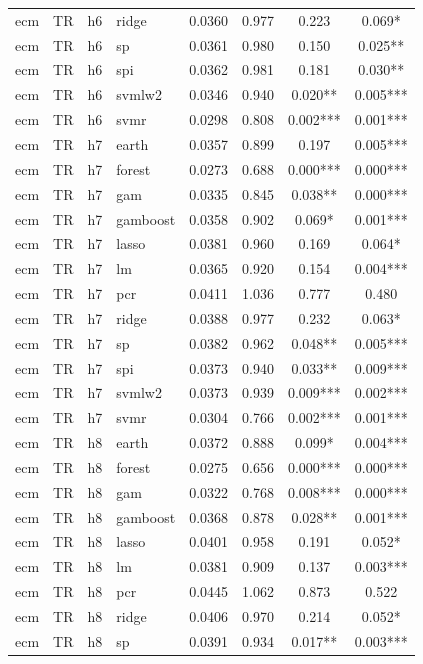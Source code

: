 \begin{ThreePartTable}
\begin{longtable}[t]{llclcccc}
ecm & TR & h6 & ridge & 0.0360 & 0.977 & 0.223 & 0.069*\\
ecm & TR & h6 & sp & 0.0361 & 0.980 & 0.150 & 0.025**\\
ecm & TR & h6 & spi & 0.0362 & 0.981 & 0.181 & 0.030**\\
ecm & TR & h6 & svmlw2 & 0.0346 & 0.940 & 0.020** & 0.005***\\
ecm & TR & h6 & svmr & 0.0298 & 0.808 & 0.002*** & 0.001***\\
\addlinespace
ecm & TR & h7 & earth & 0.0357 & 0.899 & 0.197 & 0.005***\\
ecm & TR & h7 & forest & 0.0273 & 0.688 & 0.000*** & 0.000***\\
ecm & TR & h7 & gam & 0.0335 & 0.845 & 0.038** & 0.000***\\
ecm & TR & h7 & gamboost & 0.0358 & 0.902 & 0.069* & 0.001***\\
ecm & TR & h7 & lasso & 0.0381 & 0.960 & 0.169 & 0.064*\\
ecm & TR & h7 & lm & 0.0365 & 0.920 & 0.154 & 0.004***\\
ecm & TR & h7 & pcr & 0.0411 & 1.036 & 0.777 & 0.480\\
ecm & TR & h7 & ridge & 0.0388 & 0.977 & 0.232 & 0.063*\\
ecm & TR & h7 & sp & 0.0382 & 0.962 & 0.048** & 0.005***\\
ecm & TR & h7 & spi & 0.0373 & 0.940 & 0.033** & 0.009***\\
ecm & TR & h7 & svmlw2 & 0.0373 & 0.939 & 0.009*** & 0.002***\\
ecm & TR & h7 & svmr & 0.0304 & 0.766 & 0.002*** & 0.001***\\
\addlinespace
ecm & TR & h8 & earth & 0.0372 & 0.888 & 0.099* & 0.004***\\
ecm & TR & h8 & forest & 0.0275 & 0.656 & 0.000*** & 0.000***\\
ecm & TR & h8 & gam & 0.0322 & 0.768 & 0.008*** & 0.000***\\
ecm & TR & h8 & gamboost & 0.0368 & 0.878 & 0.028** & 0.001***\\
ecm & TR & h8 & lasso & 0.0401 & 0.958 & 0.191 & 0.052*\\
ecm & TR & h8 & lm & 0.0381 & 0.909 & 0.137 & 0.003***\\
ecm & TR & h8 & pcr & 0.0445 & 1.062 & 0.873 & 0.522\\
ecm & TR & h8 & ridge & 0.0406 & 0.970 & 0.214 & 0.052*\\
ecm & TR & h8 & sp & 0.0391 & 0.934 & 0.017** & 0.003***\\

\end{longtable}
\end{ThreePartTable}
